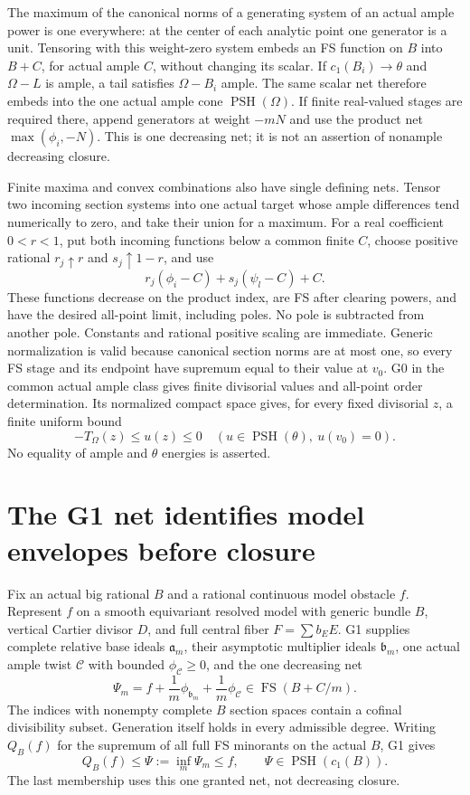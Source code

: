 \documentclass[10pt]{article}
\newcommand{\PSH}{\operatorname{PSH}}
\newcommand{\FS}{\operatorname{FS}}
\begin{document}
The maximum of the canonical norms of a generating system of an actual
ample power is one everywhere: at the center of each analytic point one
generator is a unit. Tensoring with this weight-zero system embeds an FS
function on $B$ into $B+C$, for actual ample $C$, without changing its scalar.
If $c_1(B_i)\to\theta$ and $\Omega-L$ is ample, a tail satisfies
$\Omega-B_i$ ample. The same scalar net therefore embeds into the one
actual ample cone $\PSH(\Omega)$. If finite real-valued stages are required
there, append generators at weight $-mN$ and use the product net
$\max(\phi_i,-N)$. This is one decreasing net; it is not an assertion of
nonample decreasing closure.

Finite maxima and convex combinations also have single defining nets.
Tensor two incoming section systems into one actual target whose ample
differences tend numerically to zero, and take their union for a maximum.
For a real coefficient $0<r<1$, put both incoming functions below a common
finite $C$, choose positive rational $r_j\uparrow r$ and
$s_j\uparrow1-r$, and use
\[
 r_j(\phi_i-C)+s_j(\psi_l-C)+C.
\]
These functions decrease on the product index, are FS after clearing powers,
and have the desired all-point limit, including poles. No pole is subtracted
from another pole. Constants and rational positive scaling are immediate.
Generic normalization is valid because canonical section norms are at most
one, so every FS stage and its endpoint have supremum equal to their value
at $v_0$. G0 in the common actual ample class gives finite divisorial values
and all-point order determination. Its normalized compact space gives, for
every fixed divisorial $z$, a finite uniform bound
\[
 -T_\Omega(z)\leq u(z)\leq0
 \quad(u\in\PSH(\theta),\ u(v_0)=0).                 \tag{2.1}
\]
No equality of ample and $\theta$ energies is asserted.

\section{The G1 net identifies model envelopes before closure}
Fix an actual big rational $B$ and a rational continuous model obstacle $f$.
Represent $f$ on a smooth equivariant resolved model with generic bundle $B$,
vertical Cartier divisor $D$, and full central fiber $F=\sum b_EE$.
G1 supplies complete relative base ideals $\mathfrak a_m$, their asymptotic
multiplier ideals $\mathfrak b_m$, one actual ample twist $\mathcal C$ with
bounded $\phi_{\mathcal C}\geq0$, and the one decreasing net
\[
 \Psi_m=f+\frac1m\phi_{\mathfrak b_m}
               +\frac1m\phi_{\mathcal C}\in\FS(B+C/m).
                                                               \tag{3.1}
\]
The indices with nonempty complete $B$ section spaces contain a cofinal
divisibility subset. Generation itself holds in every admissible degree.
Writing $Q_B(f)$ for the supremum of all full FS minorants on the actual $B$,
G1 gives
\[
 Q_B(f)\leq\Psi:=\inf_m\Psi_m\leq f,
 \qquad\Psi\in\PSH(c_1(B)).                           \tag{3.2}
\]
The last membership uses this one granted net, not decreasing closure.
\end{document}
